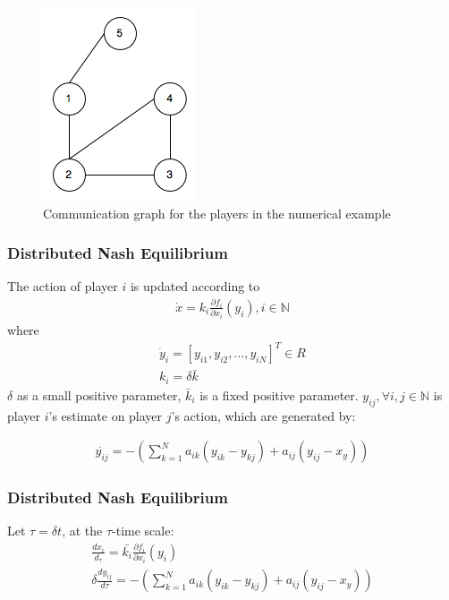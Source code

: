 \documentclass[notheorems, aspectratio=54]{beamer}
\begin{document}
\begin{frame}
  \begin{figure}[H]
    \centering
    \includegraphics[width=0.3\linewidth]{nodes.png}
    \caption{Communication graph for the players in the numerical example}
  \end{figure}

\end{frame}

\begin{frame}
  \frametitle{Distributed Nash Equilibrium}

  The action of player $i$ is updated according to\newline
  \begin{gather}
    \dot{x} = k_i \frac {\partial f_i}{\partial x_i}(y_i), i \in \mathbb{N} 
  \end{gather}
  where
   \begin{gather}
     \dot{y}_i = [y_{i1}, y_{i2},...,y_{iN}]^T \in R \nonumber \\
     k_i = \delta \bar{k} \nonumber
   \end{gather}
   $\delta$ as a small positive parameter, $\bar{k}_i$ is a fixed positive parameter.\newline
   $y_{ij}, \forall i, j \in \mathbb{N}$ is player $i$'s estimate on player $j$'s action, which are generated by:\newline

   \begin{gather}
     \dot{y_{ij}}=-\left(\sum_{k=1}^N a_{ik}(y_{ik}-y_{kj})+a_{ij}(y_{ij}-x_y)\right) \nonumber
   \end{gather}

\end{frame}

\begin{frame}
  \frametitle{Distributed Nash Equilibrium}
  Let $\tau=\delta t$, at the $\tau$-time scale:\newline
  \begin{gather}
    \frac{dx_i}{d_{\tau}}=\bar{k_i}\frac{\partial f_i}{\partial x_i}(y_i)\nonumber\\
    \delta \frac{dy_{ij}}{d\tau}=-\left(\sum_{k=1}^N a_{ik}(y_{ik}-y_{kj})+a_{ij}(y_{ij}-x_y)\right) 
  \end{gather}
\end{frame}
\end{document}
